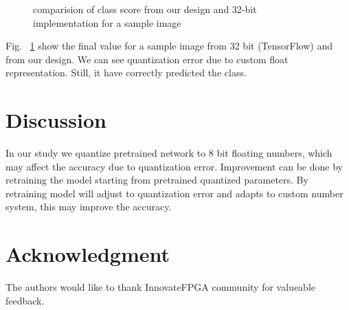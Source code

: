 \documentclass[conference]{IEEEtran}
\begin{document}
\begin{figure} 
   \centering
   \label{1b}
 \caption{comparision of class score from our design and 32-bit implementation for a sample image}
 \label{fig1} 
\end{figure}


Fig. ~\ref{fig1} show the final value for a sample image from 32 bit (TensorFlow) and from our design. We can see quantization error due to custom float representation. Still, it have correctly predicted the class. 



\section{Discussion}
In our study we quantize pretrained network to 8 bit floating numbers, which may affect the accuracy due to quantization error. Improvement can be done by retraining the model starting from pretrained quantized parameters. By retraining model will adjust to quantization error and adapts to custom number system, this may improve the accuracy.

\section*{Acknowledgment}
The authors would like to thank InnovateFPGA community for valueable feedback.



\end{document}

